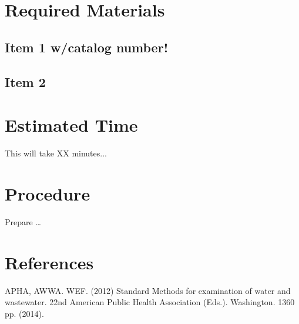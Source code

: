 \documentclass[12pt]{../SOP3_beta}
\begin{document}
\section{Required Materials}

\subsection{Item 1 w/catalog number!}
\subsection{Item 2}

\section{Estimated Time}

\NP This will take XX minutes...

\section{Procedure}

\NP Prepare \dots

\NP

\section{References}

\NP APHA, AWWA. WEF. (2012) Standard Methods for examination of water and wastewater. 22nd American Public Health Association (Eds.). Washington. 1360 pp. (2014).
\end{document}
